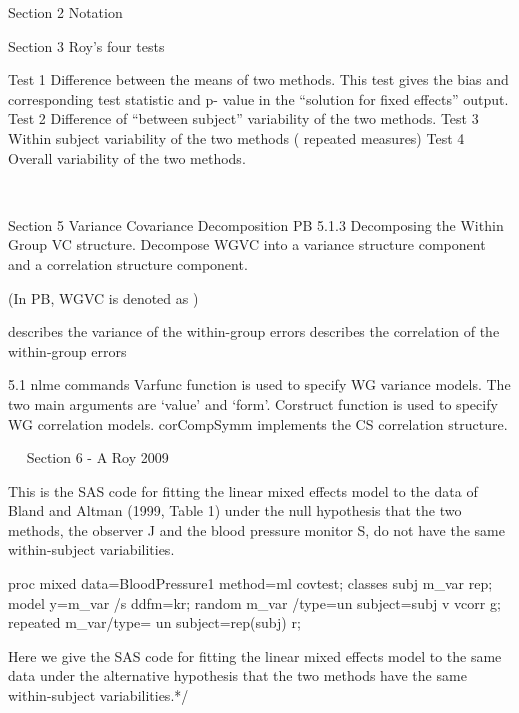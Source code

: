 \newpage


Section 2 Notation

 
 
  
 
 
 
 
  
 


Section 3 Roy’s four tests

Test 1  Difference between the means of two methods. This test gives the bias and corresponding test statistic and p- value in the “solution for fixed effects” output.
Test 2  Difference of “between subject” variability of the two methods.
Test 3  Within subject variability  of the two methods ( repeated measures)
Test 4  Overall variability of the two methods.

 


 





Section 5 Variance Covariance Decomposition
PB 5.1.3 Decomposing the Within Group VC structure.
Decompose WGVC into a variance structure component and a correlation structure component.
 
(In PB, WGVC is denoted as  )

  describes the variance of the within-group errors 
  describes the correlation of the within-group errors 

5.1 nlme commands
Varfunc function is used to specify WG variance models. The two main arguments are ‘value’ and ‘form’.
Corstruct function is used to specify WG correlation models.
corCompSymm implements the CS correlation structure.

 
Section 6  -  A Roy 2009

This is the SAS code for fitting the linear mixed effects model to the data of Bland and Altman (1999, Table 1) under the null hypothesis that the two methods, the observer J and the blood pressure monitor S, do not have the same within-subject variabilities. 

proc mixed data=BloodPressure1 method=ml covtest;
classes subj m_var rep;
model y=m_var /s ddfm=kr;
random m_var /type=un subject=subj v vcorr g;
repeated m_var/type= un subject=rep(subj) r;


Here we give the SAS code for fitting the linear mixed effects model to the same data under the alternative hypothesis that the two methods have the same within-subject variabilities.*/

